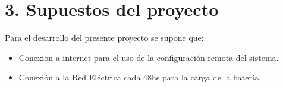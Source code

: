 \section{3. Supuestos del proyecto}
\label{sec:supuestos}


Para el desarrollo del presente proyecto se supone que:
\begin{itemize}
  \item Conexion a internet para el uso de la configuración remota del sistema.
  \item Conexión a la Red Eléctrica cada 48hs para la carga de la batería.
\end{itemize}